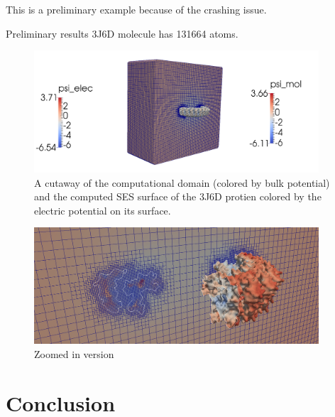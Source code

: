 \documentclass{elsarticle}
\theoremstyle{own}
\begin{document}
This is a preliminary example because of the crashing issue. 

Preliminary results 3J6D molecule has 131664 atoms. 

\begin{figure}[ht]
\begin{center}
\includegraphics[width=0.945\textwidth]{../figs/3J6D_cutaway_7_10}
\end{center}
\caption{A cutaway of the computational domain (colored by bulk potential) and the computed SES surface of the 3J6D protien colored by the electric potential on its surface.} \label{fig:3J6D_cutaway_7_!0}
\end{figure}


\begin{figure}[ht]
\begin{center}
\includegraphics[width=0.945\textwidth]{../figs/3J6D_zoom_7_10}
\end{center}
\caption{Zoomed in version} \label{fig:3J6D_zoom_7_10}
\end{figure}



\section{Conclusion}\label{sec::conclusion}



\end{document}
